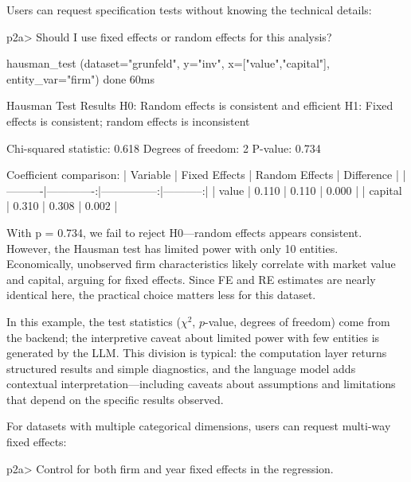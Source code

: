 Users can request specification tests without knowing the technical details:

\begin{Sinput}
p2a> Should I use fixed effects or random effects for this analysis?
\end{Sinput}

\begin{Soutput}
  [tool] hausman_test (dataset="grunfeld", y="inv",
           x=["value","capital"], entity_var="firm")           done 60ms

Hausman Test Results
H0: Random effects is consistent and efficient
H1: Fixed effects is consistent; random effects is inconsistent

Chi-squared statistic: 0.618
Degrees of freedom: 2
P-value: 0.734

Coefficient comparison:
| Variable | Fixed Effects | Random Effects | Difference |
|----------|-------------:|---------------:|-----------:|
| value    |        0.110 |          0.110 |      0.000 |
| capital  |        0.310 |          0.308 |      0.002 |

With p = 0.734, we fail to reject H0---random effects appears
consistent. However, the Hausman test has limited power with only
10 entities. Economically, unobserved firm characteristics likely
correlate with market value and capital, arguing for fixed effects.
Since FE and RE estimates are nearly identical here, the practical
choice matters less for this dataset.
\end{Soutput}

\noindent In this example, the test statistics ($\chi^2$, $p$-value,
degrees of freedom) come from the  backend; the interpretive
caveat about limited power with few entities is generated by the LLM.
This division is typical: the computation layer returns structured results
and simple diagnostics, and the language model adds contextual
interpretation---including caveats about assumptions and limitations that
depend on the specific results observed.

For datasets with multiple categorical dimensions, users can request
multi-way fixed effects:

\begin{Sinput}
p2a> Control for both firm and year fixed effects in the regression.
\end{Sinput}

